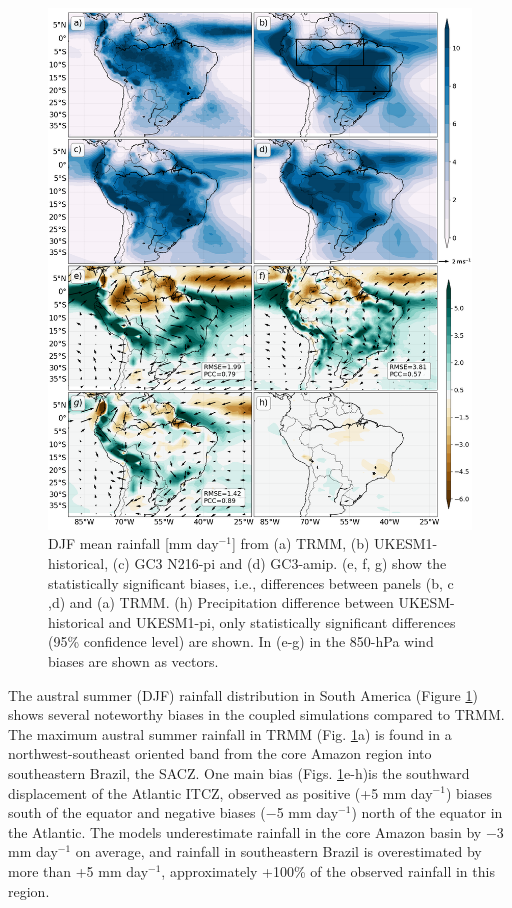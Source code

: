 \begin{figure}[b!]
\centering
 \includegraphics[width=0.875\linewidth]{figures/fig6.png}
\caption[Austral summer mean rainfall in the South American monsoon]{ DJF mean rainfall [mm day$^{-1}$] from (a) TRMM, (b) UKESM1-historical, (c) GC3 N216-pi and (d) GC3-amip. (e, f, g) show the statistically significant biases, i.e., differences between panels (b, c ,d) and (a) TRMM. (h) Precipitation difference between UKESM-historical and  UKESM1-pi, only statistically significant differences (95\% confidence level) are shown. In (e-g) in the 850-hPa wind biases are shown as vectors. }
\label{fig:6}
\end{figure}

  The austral summer (DJF) rainfall distribution in South America (Figure \ref{fig:6}) shows several noteworthy biases in the coupled simulations compared to TRMM. 
The maximum austral summer rainfall in TRMM
(Fig. \ref{fig:6}a) is found in a northwest-southeast oriented band from the core Amazon region into southeastern Brazil, the SACZ.
One main bias (Figs. \ref{fig:6}e-h)is the southward displacement of the Atlantic ITCZ, observed as positive (+5 mm day$^{-1}$) biases south of the equator and negative biases ($-$5 mm day$^{-1}$) north of the equator in the Atlantic. The models underestimate rainfall in the core Amazon basin by $-$3 mm day$^{-1}$ on average, and rainfall in southeastern Brazil is overestimated by more than +5 mm day$^{-1}$, approximately +100\% of the observed rainfall in this region.  
 

